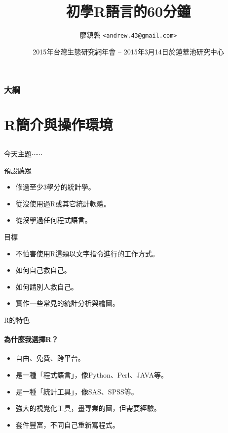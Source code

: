 \documentclass[12pt, aspectratio=43]{beamer}
\title{初學R語言的60分鐘}
\author{廖鎮磐 \texttt{<andrew.43@gmail.com>}}
\institute{東海大學生命科學系}
\date{2015年台灣生態研究網年會 -- 2015年3月14日於蓮華池研究中心}
\begin{document}
\begin{frame}
\titlepage
\end{frame}

\begin{frame}
\frametitle{大綱}
\tableofcontents
\end{frame}

\section{R簡介與操作環境}\subsection{}

\begin{frame}{今天主題$\cdots\cdots$}

\begin{block}{預設聽眾}
\begin{itemize}
\item 修過至少3學分的統計學。
\item 從沒使用過R或其它統計軟體。
\item 從沒學過任何程式語言。
\end{itemize}
\end{block}

\begin{block}{目標}
\begin{itemize}
\item 不怕害使用R這類以文字指令進行的工作方式。
\item 如何自己救自己。
\item 如何請別人救自己。
\item 實作一些常見的統計分析與繪圖。
\end{itemize}
\end{block}

\end{frame}




\begin{frame}{R的特色}
\framesubtitle{為什麼我選擇R？}
\begin{itemize}
\item 自由、免費、跨平台。
\item 是一種「程式語言」，像Python、Perl、JAVA等。
\item 是一種「統計工具」，像SAS、SPSS等。
\item 強大的視覺化工具，畫專業的圖，但需要經驗。
\item 套件豐富，不同自己重新寫程式。
\end{itemize}
\end{frame}
\end{document}
